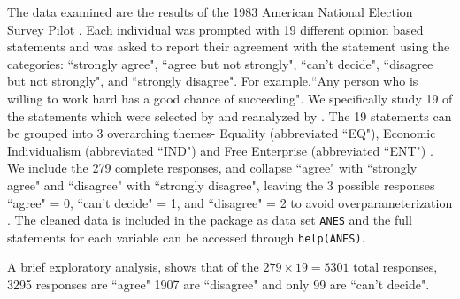 \documentclass{article}\usepackage[]{graphicx}\usepackage[]{color}
\begin{document}
The data examined are the results of the 1983 American National Election Survey Pilot \citep{ANES}. Each individual was prompted with 19 different opinion based statements and was asked to report their agreement with the statement using the categories: ``strongly agree", ``agree but not strongly", ``can't decide", ``disagree but not strongly", and ``strongly disagree". For example,``Any person who is willing to work hard has a good chance of succeeding". We specifically study 19 of the statements which were selected by \cite{feldman1988structure} and reanalyzed by \cite[Gross and Manrique-Vallier, CH6]{Airoldi2014Handbook}.  The 19 statements can be grouped into 3 overarching themes- Equality (abbreviated ``EQ"), Economic Individualism (abbreviated ``IND") and Free Enterprise (abbreviated ``ENT") \citep{feldman1988structure}.  We include the 279 complete responses, and collapse ``agree" with ``strongly agree" and ``disagree"  with ``strongly disagree", leaving the 3 possible responses ``agree" = 0, ``can't decide" = 1, and ``disagree" = 2 to avoid overparameterization \citep[Gross and Manrique-Vallier, CH 6]{Airoldi2014Handbook}. The cleaned data is included in the package as data set \texttt{ANES} and the full statements for each variable can be accessed through \texttt{help(ANES)}. 

A brief exploratory analysis, shows that of the $279 \times 19 = 5301$ total responses, 3295 responses are ``agree" 1907 are ``disagree" and only 99 are ``can't decide".
\end{document}
